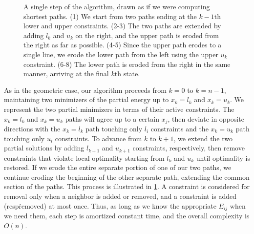 \documentclass[11pt]{article}
\begin{document}
\begin{figure}
\begin{center}
\end{center}
\caption{A single step of the algorithm, drawn as if we were computing shortest paths.
(1) We start from two paths ending at the $k-1$th lower and upper constraints.
(2-3) The two paths are extended by adding $l_k$ and $u_k$ on the right, and the upper path is eroded from the right as far as possible.
(4-5) Since the upper path erodes to a single line, we erode the lower path from the left using the upper $u_k$ constraint.
(6-8) The lower path is eroded from the right in the same manner, arriving at the final $k$th state.
\label{erode}}
\end{figure}

As in the geometric case, our algorithm proceeds from $k = 0$ to $k = n-1$, maintaining two minimizers of the partial energy up to $x_k = l_k$ and $x_k = u_k$.  We represent the two partial minimizers in terms of
their active constraints.  The $x_k = l_k$ and $x_k = u_k$ paths will agree up to a certain $x_j$, then deviate
in opposite directions with the $x_k = l_k$ path touching only $l_i$ constraints and the $x_k = u_k$ path touching only $u_i$ constraints.  To advance from $k$ to $k+1$, we extend the two partial solutions by adding
$l_{k+1}$ and $u_{k+1}$ constraints, respectively, then remove constraints that violate local optimality starting from $l_k$ and $u_k$ until optimality is restored.  If we erode the entire separate
portion of one of our two paths, we continue eroding the beginning of the other separate path, extending the common section of the paths.  This process is illustrated in \cref{erode}.
A constraint is considered for removal only when a neighbor is added or removed, and a constraint is added (resp\. removed) at most once.  Thus, as long as we know the appropriate $E_{ij}$ when we need them, each step
is amortized constant time, and the overall complexity is $O(n)$.
\end{document}
